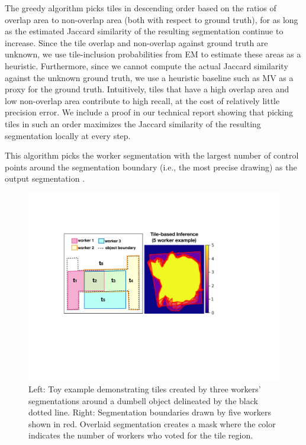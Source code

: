 \par \noindent The greedy algorithm picks tiles in descending order based on the ratios of overlap area to non-overlap area (both with respect to ground truth), for as long as the estimated Jaccard similarity of the resulting segmentation continue to increase. Since the tile overlap and non-overlap against ground truth are unknown, we use tile-inclusion probabilities from EM to estimate these areas as a heuristic. Furthermore, since we cannot compute the actual Jaccard similarity against the unknown ground truth, we use a heuristic baseline such as MV as a proxy for the ground truth. Intuitively, tiles that have a high overlap area and low non-overlap area contribute to high recall, at the cost of relatively little precision error. We include a proof in our technical report showing that picking tiles in such an order maximizes the Jaccard similarity of the resulting segmentation locally at every step. 

\par \noindent This algorithm picks the worker segmentation with the largest number of control points around the segmentation boundary (i.e., the most precise drawing) as the output segmentation \cite{Vittayakorn2011,Sorokin2008}.

\begin{figure}[h!]
\centering
\includegraphics[width=0.85\linewidth]{plots/tile.pdf}
\caption{Left: Toy example demonstrating tiles created by three workers' segmentations around a dumbell object delineated by the black dotted line. Right: Segmentation boundaries drawn by five workers shown in red. Overlaid segmentation creates a mask where the color indicates the number of workers who voted for the tile region.}
\label{tile_demo}
\setlength{\abovecaptionskip}{-15pt}
\setlength{\belowcaptionskip}{-25pt}
\end{figure}  
